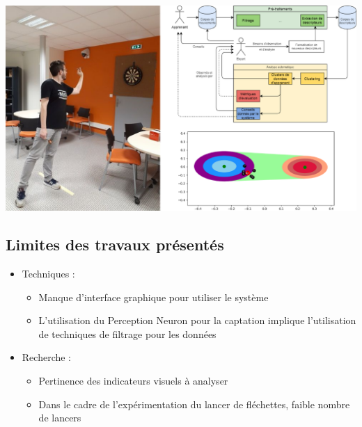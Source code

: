 \documentclass[svgnames]{beamer}
\begin{document}
	\begin{frame}{\subsecname}
		\centering
		\includegraphics[scale=1.15]{img/resume.png}
	\end{frame}
	
	\subsection{Limites des travaux présentés}
	\begin{frame}{\subsecname}
		\begin{itemize}[label=$\bullet$]
			\item Techniques :
			\begin{itemize}[label=$-$]
				\item Manque d'interface graphique pour utiliser le système
				\item L'utilisation du Perception Neuron pour la captation implique l'utilisation de techniques de filtrage pour les données
			\end{itemize}
			
			\item Recherche :
			\begin{itemize}[label=$-$]
				\item Pertinence des indicateurs visuels à analyser
				\item Dans le cadre de l'expérimentation du lancer de fléchettes, faible nombre de lancers
			\end{itemize}
			
			
		\end{itemize}
	\end{frame}
	
\end{document}
